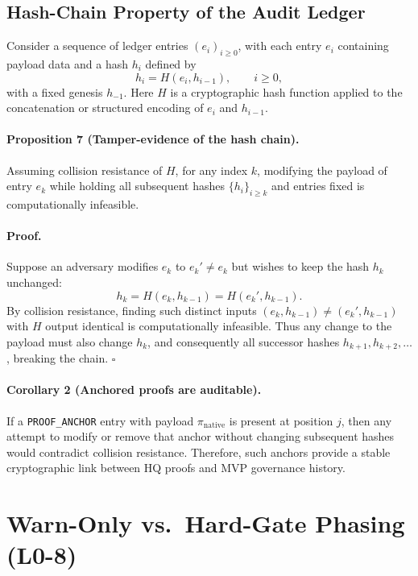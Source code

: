 \documentclass[11pt]{article}
\begin{document}
\subsection{Hash-Chain Property of the Audit Ledger}

Consider a sequence of ledger entries \((e_i)_{i\ge 0}\), with each entry \(e_i\) containing payload data and a hash \(h_i\) defined by
\[
  h_i = H(e_i, h_{i-1}),\qquad i\ge 0,
\]
with a fixed genesis \(h_{-1}\).\cite{cite:41}
Here \(H\) is a cryptographic hash function applied to the concatenation or structured encoding of \(e_i\) and \(h_{i-1}\).

\paragraph{Proposition 7 (Tamper-evidence of the hash chain).}
Assuming collision resistance of \(H\), for any index \(k\), modifying the payload of entry \(e_k\) while holding all subsequent hashes \(\{h_i\}_{i\ge k}\) and entries fixed is computationally infeasible.

\paragraph{Proof.}
Suppose an adversary modifies \(e_k\) to \(e_k'\neq e_k\) but wishes to keep the hash \(h_k\) unchanged:
\[
  h_k = H(e_k,h_{k-1}) = H(e_k', h_{k-1}).
\]
By collision resistance, finding such distinct inputs \((e_k,h_{k-1})\neq(e_k',h_{k-1})\) with \(H\) output identical is computationally infeasible. Thus any change to the payload must also change \(h_k\), and consequently all successor hashes \(h_{k+1}, h_{k+2},\dots\), breaking the chain. \(\square\)

\paragraph{Corollary 2 (Anchored proofs are auditable).}
If a \texttt{PROOF\_ANCHOR} entry with payload \(\pi_{\mathrm{native}}\) is present at position \(j\), then any attempt to modify or remove that anchor without changing subsequent hashes would contradict collision resistance. Therefore, such anchors provide a stable cryptographic link between HQ proofs and MVP governance history.

\section{Warn-Only vs.\ Hard-Gate Phasing (L0-8)}
\end{document}
